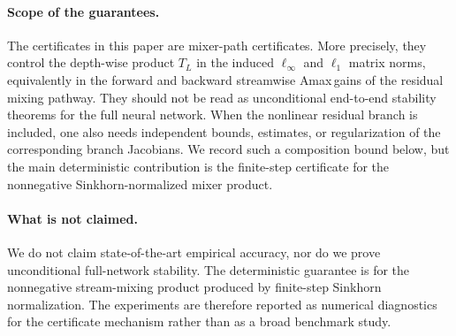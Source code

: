 \documentclass[11pt]{article}
\numberwithin{equation}{section}
\theoremstyle{plain}
\theoremstyle{definition}
\theoremstyle{remark}
\newcommand{\Amax}{\textsf{Amax}\,}
\begin{document}
\paragraph{Scope of the guarantees.}
The certificates in this paper are mixer-path certificates.  More precisely,
they control the depth-wise product \(T_L\) in the induced \(\ell_\infty\) and
\(\ell_1\) matrix norms, equivalently in the forward and backward streamwise
\Amax gains of the residual mixing pathway.  They should not be read as
unconditional end-to-end stability theorems for the full neural network.  When
the nonlinear residual branch is included, one also needs independent bounds,
estimates, or regularization of the corresponding branch Jacobians.  We record
such a composition bound below, but the main deterministic contribution is the
finite-step certificate for the nonnegative Sinkhorn-normalized mixer product.

\paragraph{What is not claimed.}
We do not claim state-of-the-art empirical accuracy, nor do we prove
unconditional full-network stability.  The deterministic guarantee is for the
nonnegative stream-mixing product produced by finite-step Sinkhorn
normalization.  The experiments are therefore reported as numerical diagnostics
for the certificate mechanism rather than as a broad benchmark study.
\end{document}
